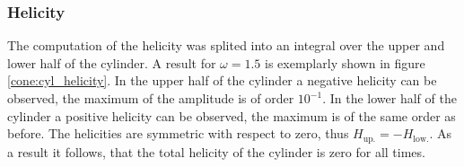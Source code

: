 \subsubsection{Helicity}

The computation of the helicity was splited into an integral over the upper and lower half
of the cylinder.  A result for $\omega=1.5$ is exemplarly shown in figure \ref{cone:cyl_helicity}.
In the upper half of the cylinder a negative helicity can be observed, the maximum of the amplitude is of order $10^{-1}$.
In the lower half of the cylinder a positive helicity can be observed, the maximum is of the same order as before.
The helicities are symmetric with respect to zero, thus $H_{\text{up.}} = -H_{\text{low.}}$.
As a result it follows, that the total helicity of the cylinder is zero for all times.

